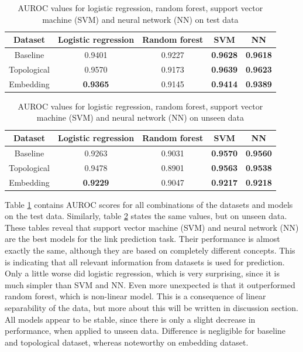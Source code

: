 \documentclass[9pt,twocolumn,twoside]{pnas-new}
\begin{document}
\begin{table}[h]
\centering
\begin{tabular}{ccccc}
Dataset & Logistic regression & Random forest & SVM & NN \\
\midrule
Baseline & 0.9401 & 0.9227 & \textbf{0.9628} & \textbf{0.9618} \\
Topological & 0.9570 & 0.9173 & \textbf{0.9639} & \textbf{0.9623} \\
Embedding & \textbf{0.9365} & 0.9145 & \textbf{0.9414} & \textbf{0.9389} \\
\bottomrule
\end{tabular}
\caption{AUROC values for logistic regression, random forest, support vector machine (SVM) and neural network (NN) on test data}
\label{table:normal_results}
\end{table}



\begin{table}[h]
\centering
\begin{tabular}{ccccc}
Dataset & Logistic regression & Random forest & SVM & NN \\
\midrule
Baseline & 0.9263 & 0.9031 & \textbf{0.9570} & \textbf{0.9560} \\
Topological & 0.9478 & 0.8901 & \textbf{0.9563} & \textbf{0.9538} \\
Embedding & \textbf{0.9229} & 0.9047 & \textbf{0.9217} & \textbf{0.9218} \\
\bottomrule
\end{tabular}
\caption{AUROC values for logistic regression, random forest, support vector machine (SVM) and neural network (NN) on unseen data}
\label{table:unseen_results}
\end{table}





Table \ref{table:normal_results} contains AUROC scores for all combinations of the datasets and models on the test data. Similarly, table \ref{table:unseen_results} states the same values, but on unseen data. These tables reveal that support vector machine (SVM) and neural network (NN) are the best models for the link prediction task. Their performance is almost exactly the same, although they are based on completely different concepts. This is indicating that all relevant information from datasets is used for prediction. Only a little worse did logistic regression, which is very surprising, since it is much simpler than SVM and NN. Even more unexpected is that it outperformed random forest, which is non-linear model. This is a consequence of linear separability of the data, but more about this will be written in discussion section. All models appear to be stable, since there is only a slight decrease in performance, when applied to unseen data. Difference is negligible for baseline and topological dataset, whereas noteworthy on embedding dataset. 
\end{document}

